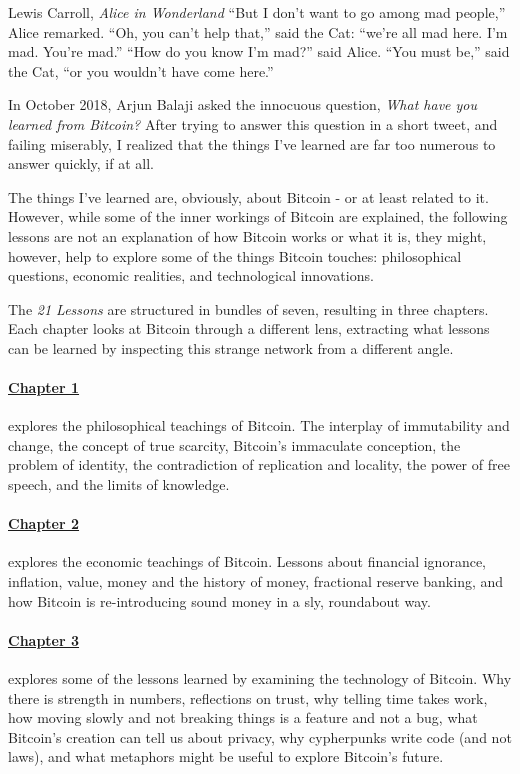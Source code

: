 \label{ch:introduction}

\begin{chapquote}{Lewis Carroll, \textit{Alice in Wonderland}}
``But I don’t want to go among mad people,'' Alice remarked. ``Oh, you can’t
help that,'' said the Cat: ``we’re all mad here. I’m mad. You’re mad.'' ``How do
you know I’m mad?'' said Alice. ``You must be,'' said the Cat, ``or you wouldn’t
have come here.''
\end{chapquote}

In October 2018, Arjun Balaji asked the innocuous question,
\textit{What have you learned from Bitcoin?} After trying to answer this
question in a short tweet, and failing miserably, I realized that the things
I've learned are far too numerous to answer quickly, if at all.

The things I've learned are, obviously, about Bitcoin - or at least related to
it. However, while some of the inner workings of Bitcoin are explained, the
following lessons are not an explanation of how Bitcoin works or what it is,
they might, however, help to explore some of the things Bitcoin touches:
philosophical questions, economic realities, and technological innovations.

The \textit{21 Lessons} are structured in bundles of seven, resulting in three
chapters. Each chapter looks at Bitcoin through a different lens, extracting
what lessons can be learned by inspecting this strange network from a different
angle.

\paragraph{\hyperref[ch:philosophy]{Chapter 1}}{explores the philosophical
teachings of Bitcoin. The interplay of immutability and change, the concept of
true scarcity, Bitcoin's immaculate conception, the problem of identity, the
contradiction of replication and locality, the power of free speech, and the
limits of knowledge.
}

\paragraph{\hyperref[ch:economics]{Chapter 2}}{explores the economic teachings
of Bitcoin. Lessons about financial ignorance, inflation, value, money and the
history of money, fractional reserve banking, and how Bitcoin is re-introducing
sound money in a sly, roundabout way.}

\paragraph{\hyperref[ch:technology]{Chapter 3}}{explores some of the lessons
learned by examining the technology of Bitcoin.  Why there is strength in
numbers, reflections on trust, why telling time takes work, how moving slowly
and not breaking things is a feature and not a bug, what Bitcoin's creation can
tell us about privacy, why cypherpunks write code (and not laws), and what
metaphors might be useful to explore Bitcoin's future.}

